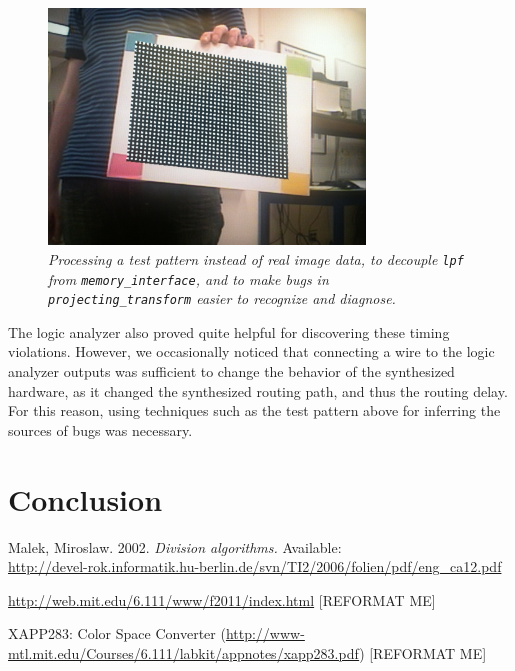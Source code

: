 \documentclass[10pt]{article}
\begin{document}
\begin{figure}[h!]
\centering
\includegraphics[width=0.75\textwidth]{images/IMG_0121.JPG}
\caption{\emph{Processing a test pattern instead of real image data, to decouple {\tt lpf} from {\tt memory\_interface}, and to make bugs in {\tt projecting\_transform} easier to recognize and diagnose.}}
\end{figure}

The logic analyzer also proved quite helpful for discovering these timing violations. However, we occasionally noticed that connecting a wire to the logic analyzer outputs was sufficient to change the behavior of the synthesized hardware, as it changed the synthesized routing path, and thus the routing delay. For this reason, using techniques such as the test pattern above for inferring the sources of bugs was necessary.

\section{Conclusion}



\begin{thebibliography}{9}

  Malek, Miroslaw.
  2002.
  \emph{Division algorithms.}
  Available: \\ \url{http://devel-rok.informatik.hu-berlin.de/svn/TI2/2006/folien/pdf/eng\_ca12.pdf}

  \url{http://web.mit.edu/6.111/www/f2011/index.html} [REFORMAT ME]

  XAPP283: Color Space Converter (\url{http://www-mtl.mit.edu/Courses/6.111/labkit/appnotes/xapp283.pdf}) [REFORMAT ME]

\end{thebibliography}
\end{document}
